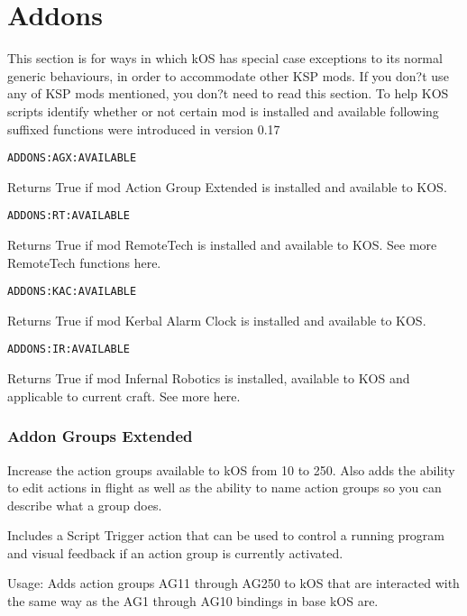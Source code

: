 \part{Addons}
	This section is for ways in which kOS has special case exceptions to its normal generic behaviours, in order to accommodate other KSP mods. If you don?t use any of KSP mods mentioned, you don?t need to read this section.
	To help KOS scripts identify whether or not certain mod is installed and available following suffixed functions were introduced in version 0.17

\begin{Verbatim}[frame=single]
ADDONS:AGX:AVAILABLE
\end{Verbatim}

Returns True if mod Action Group Extended is installed and available to KOS.

\begin{Verbatim}[frame=single]
ADDONS:RT:AVAILABLE
\end{Verbatim}

Returns True if mod RemoteTech is installed and available to KOS. See more RemoteTech functions here.

\begin{Verbatim}[frame=single]
ADDONS:KAC:AVAILABLE
\end{Verbatim}

Returns True if mod Kerbal Alarm Clock is installed and available to KOS.

\begin{Verbatim}[frame=single]
ADDONS:IR:AVAILABLE
\end{Verbatim}

Returns True if mod Infernal Robotics is installed, available to KOS and applicable to current craft. See more here.
	\section{Addon Groups Extended}%
	Increase the action groups available to kOS from 10 to 250. Also adds the ability to edit actions in flight as well as the ability to name action groups so you can describe what a group does.

Includes a Script Trigger action that can be used to control a running program and visual feedback if an action group is currently activated.

Usage: Adds action groups AG11 through AG250 to kOS that are interacted with the same way as the AG1 through AG10 bindings in base kOS are.

